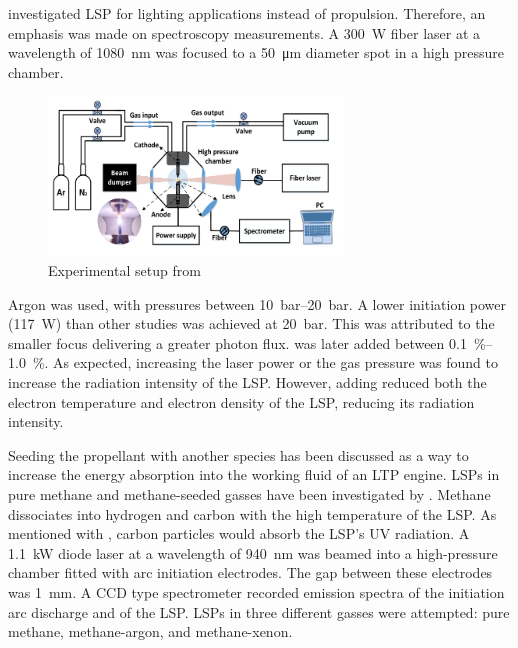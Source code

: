         \textcite{luCharacteristicDiagnosticsLaserStabilized2022a} investigated LSP for lighting applications instead of propulsion. Therefore, an emphasis was made on spectroscopy measurements. A \qty{300}{W} fiber laser at a wavelength of \qty{1080}{nm} was focused to a \qty{50}{μm} diameter spot in a high pressure chamber.
        \begin{figure}[!ht]
            \centering
            \includegraphics[width=0.7\textwidth]{assets/2 background/Lu apparatus.png}
            \caption{Experimental setup from \textcite{luCharacteristicDiagnosticsLaserStabilized2022a}}
            \label{fig:Lu apparatus}
        \end{figure}
        Argon was used, with pressures between \qtyrange{10}{20}{bar}. A lower initiation power (\qty{117}{W}) than other studies was achieved at \qty{20}{bar}. This was attributed to the smaller focus delivering a greater photon flux.  was later added between \qtyrange{0.1}{1.0}{\%}. As expected, increasing the laser power or the gas pressure was found to increase the radiation intensity of the LSP. However, adding  reduced both the electron temperature and electron density of the LSP, reducing its radiation intensity.

        Seeding the propellant with another species has been discussed as a way to increase the energy absorption into the working fluid of an LTP engine. LSPs in pure methane and methane-seeded gasses have been investigated by \textcite{kameiMethaneMethaneXenon2020}. Methane dissociates into hydrogen and carbon with the high temperature of the LSP. As mentioned with \textcite{shojiLaserheatedRocketThruster1977}, carbon particles would absorb the LSP's UV radiation.  A \qty{1.1}{kW} diode laser at a wavelength of \qty{940}{nm} was beamed into a high-pressure chamber fitted with arc initiation electrodes. The gap between these electrodes was \qty{1}{mm}. A CCD type spectrometer recorded emission spectra of the initiation arc discharge and of the LSP. LSPs in three different gasses were attempted: pure methane, methane-argon, and methane-xenon.
        
